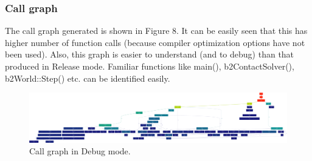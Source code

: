 \documentclass[pdftex,12pt,a4paper]{article}
\begin{document}
\subsubsection{Call graph}

\par{The call graph generated is shown in Figure 8. It can be easily seen that this has higher number of function calls (because compiler optimization options have not been used). Also, this graph is easier to understand (and to debug) than that produced in Release mode. Familiar functions like main(), b2ContactSolver(), b2World::Step() etc. can be identified easily.}

\begin{figure}[h!]
\centering
\includegraphics[scale=.044]{../images/debugcallgraph.png}
\caption{Call graph in Debug mode.}
\end{figure}



\end{document}
